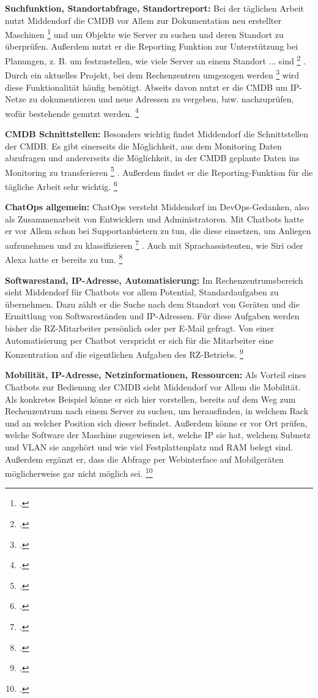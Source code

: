 \textbf{Suchfunktion, Standortabfrage, Standortreport: }Bei der täglichen Arbeit nutzt Middendorf die \acs{CMDB} vor Allem zur \glqq{}Dokumentation neu erstellter Maschinen\grqq
\footcite[][o. \pno]{Midd_2019}
 und um Objekte wie Server zu suchen und deren Standort zu überprüfen. Außerdem nutzt er die Reporting Funktion zur Unterstützung bei Planungen, z. B. um festzustellen, \glqq{}wie viele Server an einem Standort ... sind\grqq
\footcite[][o. \pno]{Midd_2019}
. Durch ein aktuelles \glqq{}Projekt, bei dem Rechenzentren umgezogen werden\grqq
\footcite[][o. \pno]{Midd_2019}
 wird diese Funktionalität häufig benötigt. Abseits davon nutzt er die \acs{CMDB} um IP-Netze zu dokumentieren und neue Adressen zu vergeben, bzw. nachzuprüfen, wofür bestehende genutzt werden.
\footcite[Vgl.][o. \pno]{Midd_2019}

\textbf{CMDB Schnittstellen: }Besonders wichtig findet Middendorf die Schnittstellen der \acs{CMDB}. Es gibt einerseits die Möglichkeit, aus dem Monitoring Daten abzufragen und andererseits die Möglichkeit, in \glqq{}der CMDB geplante Daten ins Monitoring zu transferieren\grqq
\footcite[][o. \pno]{Midd_2019}
.
Außerdem findet er die Reporting-Funktion für die tägliche Arbeit sehr wichtig.
\footcite[Vgl.][o. \pno]{Midd_2019}

\textbf{ChatOps allgemein: }ChatOps versteht Middendorf im DevOps-Gedanken, also als Zusammenarbeit von Entwicklern und Administratoren.
Mit Chatbots hatte er vor Allem schon bei Supportanbietern zu tun, die diese einsetzen, um \glqq{}Anliegen aufzunehmen und zu klassifizieren\grqq
\footcite[][o. \pno]{Midd_2019}
.
Auch mit Sprachassistenten, wie Siri oder Alexa hatte er bereits zu tun.
\footcite[Vgl.][o. \pno]{Midd_2019}

\textbf{Softwarestand, IP-Adresse, Automatisierung: }Im Rechenzentrumsbereich sieht Middendorf für Chatbots vor allem Potential, Standardaufgaben zu übernehmen. Dazu zählt er die Suche nach dem Standort von Geräten und die Ermittlung von Softwareständen und IP-Adressen. Für diese Aufgaben werden bisher die RZ-Mitarbeiter persönlich oder per E-Mail gefragt. Von einer Automatisierung per Chatbot verspricht er sich für die Mitarbeiter eine Konzentration auf die eigentlichen Aufgaben des RZ-Betriebs.
\footcite[Vgl.][o. \pno]{Midd_2019}

\textbf{Mobilität, IP-Adresse, Netzinformationen, Ressourcen: }Als Vorteil eines Chatbots zur Bedienung der \acs{CMDB} sieht Middendorf vor Allem die Mobilität. Als konkretes Beispiel könne er sich hier vorstellen, bereits auf dem Weg zum Rechenzentrum nach einem Server zu suchen, um herausfinden, in welchem Rack und an welcher Position sich dieser befindet. Außerdem könne er vor Ort prüfen, welche Software der Maschine zugewiesen ist, welche IP sie hat, welchem Subnetz und VLAN sie angehört und wie viel Festplattenplatz und RAM belegt sind.
Außerdem ergänzt er, dass die Abfrage per Webinterface auf Mobilgeräten möglicherweise gar nicht möglich sei.
\footcite[Vgl.][o. \pno]{Midd_2019}

